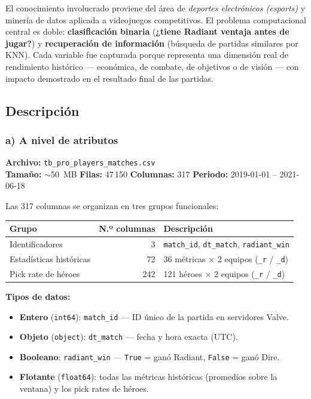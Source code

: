 \documentclass[12pt,a4paper]{article}
\begin{document}
El conocimiento involucrado proviene del \'area de \textit{deportes electr\'onicos
(esports)} y miner\'ia de datos aplicada a videojuegos competitivos. El problema
computacional central es doble: \textbf{clasificaci\'on binaria} (\textbf{¿tiene
Radiant ventaja antes de jugar?}) y \textbf{recuperaci\'on de informaci\'on}
(b\'usqueda de partidas similares por KNN). Cada variable fue capturada porque
representa una dimensi\'on real de rendimiento hist\'orico --- econ\'omica, de
combate, de objetivos o de visi\'on --- con impacto demostrado en el resultado
final de las partidas.

\subsection{Descripci\'on}

\subsubsection*{a) A nivel de atributos}

\textbf{Archivo:} \texttt{tb\_pro\_players\_matches.csv} \\
\textbf{Tama\~no:} $\sim$50~MB \quad \textbf{Filas:} 47\,150 \quad
\textbf{Columnas:} 317 \quad \textbf{Periodo:} 2019-01-01 -- 2021-06-18

Las 317 columnas se organizan en tres grupos funcionales:

\begin{center}
\begin{tabular}{lrp{7cm}}
  \toprule
  \textbf{Grupo} & \textbf{N.º columnas} & \textbf{Descripci\'on} \\
  \midrule
  Identificadores          & 3   & \texttt{match\_id}, \texttt{dt\_match}, \texttt{radiant\_win} \\
  Estad\'isticas hist\'oricas & 72  & 36 m\'etricas $\times$ 2 equipos (\texttt{\_r} / \texttt{\_d}) \\
  Pick rate de h\'eroes    & 242 & 121 h\'eroes $\times$ 2 equipos (\texttt{\_r} / \texttt{\_d}) \\
  \bottomrule
\end{tabular}
\end{center}

\textbf{Tipos de datos:}
\begin{itemize}
  \item \textbf{Entero} (\texttt{int64}): \texttt{match\_id} --- ID \'unico de la
        partida en servidores Valve.
  \item \textbf{Objeto} (\texttt{object}): \texttt{dt\_match} --- fecha y hora exacta
        (UTC).
  \item \textbf{Booleano}: \texttt{radiant\_win} --- \texttt{True} = gan\'o Radiant,
        \texttt{False} = gan\'o Dire.
  \item \textbf{Flotante} (\texttt{float64}): todas las m\'etricas hist\'oricas
        (promedios sobre la ventana) y los pick rates de h\'eroes.
\end{itemize}
\end{document}
